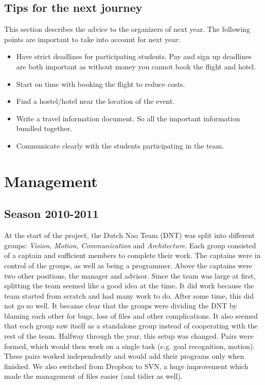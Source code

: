 \documentclass[11pt,a4paper,oneside]{article}
\begin{document}
\subsection{Tips for the next journey}
This section describes the advice to the organizers of next year. The following points are important to take into account for next year:
\begin{itemize}
\item Have strict deadlines for participating students. Pay and sign up deadlines are both important as without money you cannot book the flight and hotel.
\item Start on time with booking the flight to reduce costs.
\item Find a hostel/hotel near the location of the event.
\item Write a travel information document. So all the important information bundled together.
\item Communicate clearly with the students participating in the team.
\end{itemize}

\section{Management}

\subsection{Season 2010-2011}
At the start of the project, the Dutch Nao Team (DNT) was split into different groups: {\it Vision}, {\it Motion}, {\it Communication} and {\it Architecture}. Each group consisted of a captain and sufficient members to complete their work. The captains were in control of the groups, as well as being a programmer. Above the captains were two other positions, the manager and advisor. Since the team was large at first, splitting the team seemed like a good idea at the time. It did work because the team started from scratch and had many work to do. After some time, this did not go so well. It became clear that the groups were dividing the DNT by blaming each other for bugs, loss of files and other complications. It also seemed that each group saw itself as a standalone group instead of cooperating with the rest of the team.
Halfway through the year, this setup was changed. Pairs were formed, which would then work on a single task (e.g. goal recognition, motion). These pairs worked independently and would add their programs only when finished. We also switched from Dropbox to SVN, a huge improvement which made the management of files easier (and tidier as well). 
\end{document}
